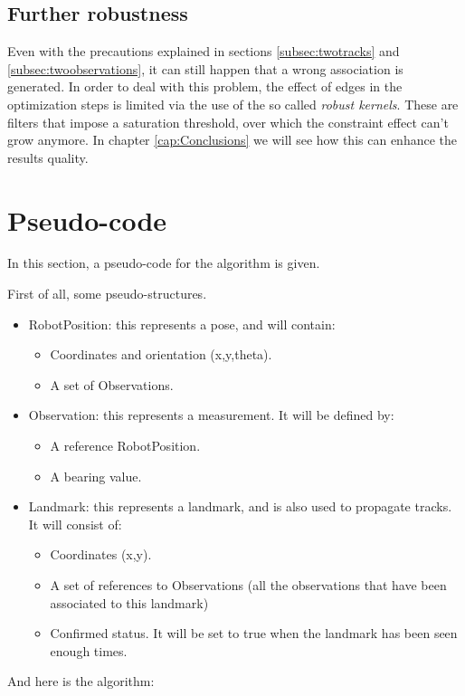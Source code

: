 \subsection{Further robustness}
Even with the precautions explained in sections \ref{subsec:twotracks} and \ref{subsec:twoobservations}, it can still happen that a wrong association is generated. In order to deal with this problem, the effect of edges in the optimization steps is limited via the use of the so called \textit{robust kernels}.
These are filters that impose a saturation threshold, over which the constraint effect can't grow anymore.
In chapter \ref{cap:Conclusions} we will see how this can enhance the results quality.

\section{Pseudo-code}\label{sec:pseudocode}
In this section, a pseudo-code for the algorithm is given.

First of all, some pseudo-structures.
\begin{itemize}
  \item RobotPosition: this represents a pose, and will contain:
    \begin{itemize}
      \item Coordinates and orientation (x,y,theta).
      \item A set of Observations.
    \end{itemize}
  \item Observation: this represents a measurement. It will be defined by:
    \begin{itemize}
      \item A reference RobotPosition.
      \item A bearing value.
    \end{itemize}
  \item Landmark: this represents a landmark, and is also used to propagate tracks. It will consist of:
    \begin{itemize}
      \item Coordinates (x,y).
      \item A set of references to Observations (all the observations that have been associated to this landmark)
      \item Confirmed status. It will be set to true when the landmark has been seen enough times.
    \end{itemize}
\end{itemize}

And here is the algorithm:


